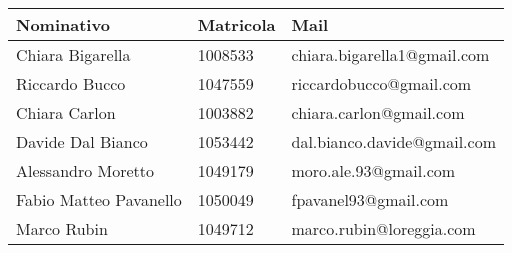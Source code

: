 \documentclass{article}
\begin{document}
	\begin{center}
	\begin{tabular}{ | p{4cm} | p{2.5cm} | p{5cm} |}
	\hline
     Nominativo & Matricola & Mail \\ \hline
     Chiara Bigarella & 1008533 & chiara.bigarella1@gmail.com \\ \hline
     Riccardo Bucco & 1047559 & riccardobucco@gmail.com \\ \hline
     Chiara Carlon & 1003882 & chiara.carlon@gmail.com \\ \hline
     Davide Dal Bianco & 1053442 & dal.bianco.davide@gmail.com \\ \hline
     Alessandro Moretto & 1049179 & moro.ale.93@gmail.com \\ \hline
     Fabio Matteo Pavanello & 1050049 & fpavanel93@gmail.com \\ \hline
     Marco Rubin & 1049712 & marco.rubin@loreggia.com \\ \hline
     \end{tabular}
	\end{center}
	
\end{document}
